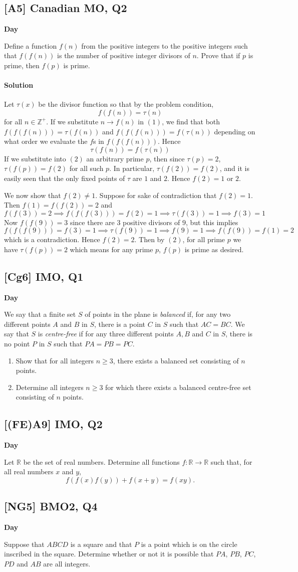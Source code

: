\documentclass[10pt]{article}
\newcommand{\themonth}{March}
\newcommand{\theyear}{2019}
\newcounter{day}
\newcounter{solution}
\newcounter{datenumber}
\newcommand{\problem}[4][0]{
	\newpage
	\subsection{[#3] \space #2} \hfill 
	{\large\textbf{Day \arabic{day}}} %
	\begin{flushleft} #4 \end{flushleft}
	\vspace{1em}
	\addtocounter{day}{1}
	\addtocounter{datenumber}{1}
	\setcounter{solution}{1}
}
\newcommand{\anonsolution}[2][0]{
	\paragraph{Solution \arabic{solution}} 
	\begin{flushleft} #2 \end{flushleft}
	\addtocounter{solution}{1}
	\vspace{1em}
}
\begin{document}
\problem[9]{2017 Canadian MO, Q2}{A5}{Define a function $f(n)$ from the positive integers to the positive integers such that $f(f(n))$ is the number of positive integer divisors of $n$. Prove that if $p$ is prime, then $f(p)$ is prime.}

\anonsolution[9]{Let \(\tau(x)\) be the divisor function so that by the problem condition, \[f(f(n))=\tau(n) \tag{1}\] for all \(n\in\mathbb{Z^+}\). If we substitute \(n\to f(n)\) in \((1)\), we find that both \(f(f(f(n)))=\tau(f(n))\) and \(f(f(f(n)))=f(\tau(n))\) depending on what order we evaluate the \(f\)s in \(f(f(f(n)))\). Hence \[\tau(f(n))=f(\tau(n))\tag{2}\] If we substitute into \((2)\) an arbitrary prime \(p\), then since \(\tau(p)=2\), \(\tau(f(p))=f(2)\) for all such \(p\).  In particular, \(\tau(f(2))=f(2)\), and it is easily seen that the only fixed points of \(\tau\) are \(1\) and \(2\). Hence \(f(2)=1\) or \(2\). 


We now show that \(f(2)\neq 1\). Suppose for sake of contradiction that \(f(2)=1\). Then \(f(1)=f(f(2))=2\) and \[f(f(3))=2 \implies f(f(f(3)))=f(2)=1 \implies \tau(f(3))=1 \implies f(3)=1\] Now \(f(f(9))=3\) since there are \(3\) positive divisors of \(9\), but this implies \[f(f(f(9)))=f(3)=1 \implies  \tau(f(9))=1 \implies f(9)=1 \implies f(f(9))=f(1)=2\] which is a contradiction. Hence \(f(2)=2\). Then by \((2)\), for all prime \(p\) we have \(\tau(f(p))=2\) which means for any prime \(p\), \(f(p)\) is prime as desired.} 

\problem[10]{2015 IMO, Q1}{Cg6}{We say that a finite set $S$ of points in the plane is \textit{balanced} if, for any two different points $A$ and $B$ in $S$, there is a point $C$ in $S$ such that $AC = BC$. We say that $S$ is \emph{centre-free} if for any three different points $A, B$ and $C$ in $S$, there is no point $P$ in $S$ such that $PA = PB = PC$. \begin{enumerate} \item Show that for all integers $n \geq 3$, there exists a balanced set consisting of $n$ points.\item Determine all integers $n \geq 3$ for which there exists a balanced centre-free set consisting of $n$ points.\end{enumerate}}

\problem[11]{2015 IMO, Q2}{(FE)A9}{Let $\mathbb{R}$ be the set of real numbers. Determine all functions $f : \mathbb{R} \to \mathbb{R}$ such that, for all real numbers $x$ and $y$, \[f(f(x)f(y)) + f(x + y) = f(xy).\]}

\problem[12]{2013 BMO2, Q4}{NG5}{Suppose that $ABCD$ is a square and that $P$ is a point which is on the circle inscribed in the square. Determine whether or not it is possible that $PA$, $PB$, $PC$, $PD$ and $AB$ are all integers.}
\end{document}
